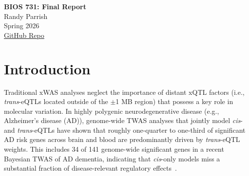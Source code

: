 \documentclass[11pt,hidelinks]{article}
\title{\projecttitle}
\author{Randy Parrish}
\date{\duedate}
\newcommand{\projecttitle}{BIOS 731: Final Report}
\newcommand{\duedate}{Spring 2026\\\textcolor{blue}{\underline{\href{https://github.com/rndparr/bios731_final_parrish}{GitHub Repo}}}}
\newcommand{\authorname}{Randy Parrish}
\newenvironment{tightcenter}{%
  \setlength\topsep{2pt}
  \setlength\parskip{2pt}
  \begin{center}
}{%
  \end{center}
}
\begin{document}
 


\clearpage%
\thispagestyle{empty}

\begin{tightcenter}
{\centering\Large\textbf{\projecttitle}}\\
{\centering\large\authorname}\\
{\centering\duedate}
\end{tightcenter}

\begin{abstract}
\noindent\normalsize 
Traditional transcriptome-wide and proteome-wide association studies (TWAS/PWAS) limit analyses to \textit{cis}- molecular quantitative trait loci (xQTL), neglecting \textit{trans}-xQTL that compose a substantial proportion of molecular variation. The BGW-xWAS tool implements a Bayesian-Genome Wide (BGW) framework based upon a Bayesian variable selection regression (BVSR) model that jointly accounts for both \textit{cis}- and \textit{trans}-xQTL factors to improve genetically-regulated gene expression (GReX) and protein abundance (GReP) imputation accuracy and xWAS power over \textit{cis}-only methods. To study both \textit{cis}- and \textit{trans}- regulatory mechanisms of AD, this study applies the BGW-xWAS tool to train xWAS models of dorsolateral prefrontal cortex tissue from ROS/MAP and integrates the results with large genome-wide association study (GWAS) summary data of Alzheimer disease (AD) dementia in order to identify genetically-regulated molecular associations underlying AD risk.


\end{abstract}


\section{Introduction}
Traditional xWAS analyses neglect the importance of distant xQTL factors (i.e., \textit{trans}-eQTLs located outside of the $\pm$1 MB region) that possess a key role in molecular variation. In highly polygenic neurodegenerative disease (e.g., Alzheimer's disease (AD)), genome-wide TWAS analyses that jointly model \textit{cis}- and \textit{trans}-eQTLs have shown that roughly one-quarter to one-third of significant AD risk genes across brain and blood are predominantly driven by \textit{trans}-eQTL weights. This includes 34 of 141 genome-wide significant genes in a recent Bayesian TWAS of AD dementia, indicating that \textit{cis}-only models miss a substantial fraction of disease-relevant regulatory effects~\cite{guoBayesianGenomewideTWAS2024}. 
\end{document}
